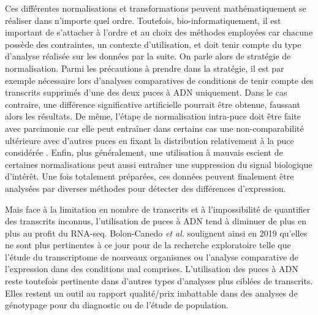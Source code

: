 Ces différentes normalisations et transformations peuvent mathématiquement se réaliser dans n'importe quel ordre. Toutefois, bio-informatiquement, il est important de s'attacher à l'ordre et au choix des méthodes employées car chacune possède des contraintes, un contexte d'utilisation, et doit tenir compte du type d'analyse réalisée sur les données par la suite. On parle alors de stratégie de normalisation. Parmi les précautions à prendre dans la stratégie, il est par exemple nécessaire lors d'analyses comparatives de conditions de tenir compte des transcrits supprimés d'une des deux puces à \acrshort{ADN} uniquement. Dans le cas contraire, une différence significative artificielle pourrait être obtenue, faussant alors les résultats. De même, l'étape de normalisation intra-puce doit être faite avec parcimonie car elle peut entraîner dans certains cas une non-comparabilité ultérieure avec d'autres puces en fixant la distribution relativement à la puce considérée \cite{Argyropoulos2006Apr}. Enfin, plus généralement, une utilisation à mauvais escient de certaines normalisations peut aussi entraîner une suppression du signal biologique d'intérêt. Une fois totalement préparées, ces données peuvent finalement être analysées par diverses méthodes pour détecter des différences d'expression.



Mais face à la limitation en nombre de transcrits et à l'impossibilité de quantifier des transcrits inconnus, l'utilisation de puces à \acrshort{ADN} tend à diminuer de plus en plus au profit du \acrshort{RNA-seq}. Bolon-Canedo \textit{et al.} soulignent ainsi en 2019 \cite{Bolon-Canedo2019} qu'elles ne sont plus pertinentes à ce jour pour de la recherche exploratoire telle que l'étude du transcriptome de nouveaux organismes ou l'analyse comparative de l'expression dans des conditions mal comprises.
L'utilisation des puces à \acrshort{ADN} reste toutefois pertinente dans d'autres types d'analyses plus ciblées de transcrits. Elles restent un outil au rapport qualité/prix imbattable dans des analyses de génotypage pour du diagnostic ou de l'étude de population.



